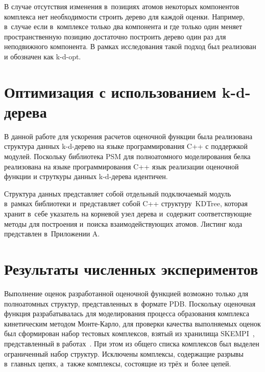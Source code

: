 В случае отсутствия изменения в~позициях атомов некоторых компонентов комплекса нет необходимости строить дерево для каждой оценки. Например, в~случае если в~комплексе только два компонента и где только один меняет пространственную позицию достаточно построить дерево один раз для неподвижного компонента. В рамках исследования такой подход был реализован и обозначен как k-d-opt.


\section{Оптимизация с использованием k-d-дерева}


В данной работе для ускорения расчетов оценочной функции была реализована структура данных k-d-дерево на языке программирования C++ с поддержкой модулей. Поскольку библиотека PSM для полноатомного моделирования белка реализована на языке программирования C++ язык реализации оценочной функции и струткуры данных k-d-дерева идентичен.

Структура данных представляет собой отдельный подключаемый модуль в~рамках библиотеки и~представляет собой C++ структуру~KDTree, которая хранит в~себе указатель на корневой узел дерева и~содержит соответствующие методы для построения и~поиска взаимодействующих атомов. Листинг кода представлен в~Приложении A.





\section{Результаты численных экспериментов}

Выполнение оценок разработанной оценочной функцией возможно только для полноатомных структур, представленных в~формате PDB. Поскольку оценочная функция разрабатывалась для моделирования процесса образования комплекса кинетическим методом Монте-Карло, для проверки качества выполняемых оценок был сформирован набор тестовых комплексов, взятый из хранилища SKEMPI~\cite{skempi}, представленный в работах~\cite{biom10071056, rate}. При этом из общего списка комплексов был выделен ограниченный набор структур. Исключены комплексы, содержащие разрывы в~главных цепях, а~также комплексы, состоящие из трёх и~более цепей. 

